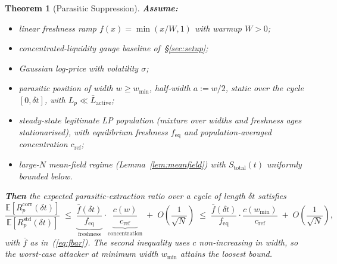 \documentclass[11pt,a4paper]{article}
\theoremstyle{cgdefinition}
\theoremstyle{cgplain}
\newtheorem{theorem}{Theorem}
\theoremstyle{cgremark}
\begin{document}
\begin{theorem}[Parasitic Suppression]\label{thm:parasitic}
\textbf{Assume:}
\begin{itemize}[leftmargin=2em,nosep,topsep=2pt]
\item linear freshness ramp $f(x) = \min(x/W, 1)$ with warmup $W > 0$;
\item concentrated-liquidity gauge baseline of~\S\ref{sec:setup};
\item Gaussian log-price with volatility $\sigma$;
\item parasitic position of width $w \geq w_{\min}$, half-width $a := w/2$, static over the cycle $[0, \delta t]$, with $L_p \ll \bar L_{\text{active}}$;
\item steady-state legitimate LP population (mixture over widths and freshness ages stationarised), with equilibrium freshness $f_{\text{eq}}$ and population-averaged concentration $c_{\text{ref}}$;
\item large-$N$ mean-field regime (Lemma~\ref{lem:meanfield}) with $S_{\text{total}}(t)$ uniformly bounded below.
\end{itemize}

\textbf{Then} the expected parasitic-extraction ratio over a cycle of length $\delta t$ satisfies
\begin{equation}\label{eq:thm1}
\frac{\mathbb{E}[R^{\text{corr}}_p(\delta t)]}{\mathbb{E}[R^{\text{std}}_p(\delta t)]} \;\leq\; \underbrace{\frac{\bar f(\delta t)}{f_{\text{eq}}}}_{\text{freshness}} \cdot \underbrace{\frac{c(w)}{c_{\text{ref}}}}_{\text{concentration}} \;+\; O\!\left(\frac{1}{\sqrt{N}}\right) \;\leq\; \frac{\bar f(\delta t)}{f_{\text{eq}}} \cdot \frac{c(w_{\min})}{c_{\text{ref}}} \;+\; O\!\left(\frac{1}{\sqrt{N}}\right),
\end{equation}
with $\bar f$ as in~(\ref{eq:fbar}). The second inequality uses $c$ non-increasing in width, so the worst-case attacker at minimum width $w_{\min}$ attains the loosest bound.
\end{theorem}
\end{document}
